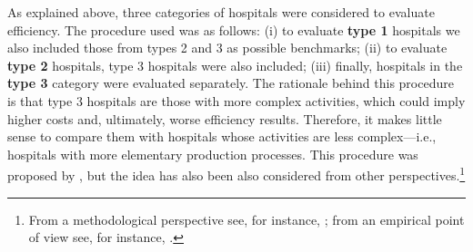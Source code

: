 \documentclass[11pt,a4paper,oneside]{article}
\begin{document}

As explained above, three categories of hospitals were considered to evaluate efficiency. The procedure used was as follows: (i) to evaluate \textbf{type 1} hospitals we also included those from types 2 and 3 as possible benchmarks; (ii) to evaluate \textbf{type 2} hospitals, type 3 hospitals were also included; (iii) finally, hospitals in the \textbf{type 3} category were evaluated separately. The rationale behind this procedure is that type 3 hospitals are those with more complex activities, which could imply higher costs and, ultimately, worse efficiency results. Therefore, it makes little sense to compare them with hospitals whose activities are less complex---i.e., hospitals with more elementary production processes. This procedure was proposed by \cite{Banker:1986wj}, but the idea has also been also considered from other perspectives.\footnote{From a methodological perspective see, for instance, \cite{battese.rao.odonnell.2004mpf,balaguer-coll_prior_tortosa-ausina_output_complexity_jpa}; from an  empirical point of view see, for instance, \cite{tortosa.Ec.Lett}.} 

\color{black}
\end{document}
